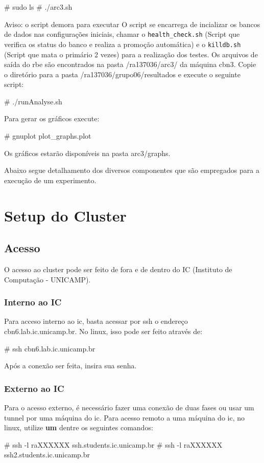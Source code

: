 \documentclass[a4paper,10pt]{article}
\begin{document}
    \begin{spverbatim}
# sudo ls
# ./arc3.sh
    \end{spverbatim}

  	Aviso: o script demora para executar
    O script se encarrega de incializar os bancos de dados nas configurações iniciais, chamar o \verb|health_check.sh| (Script que verifica os status do banco e realiza a promoção automática) e o \verb|killdb.sh| (Script que mata o primário 2 vezes) para a realização dos testes. Os arquivos de saída do rbe são encontrados na pasta /ra137036/arc3/ da máquina cbn3. Copie o diretório para a pasta /ra137036/grupo06/resultados e execute o seguinte script:
    
    \begin{spverbatim}
# ./runAnalyse.sh
    \end{spverbatim}

    Para gerar os gráficos execute:
    \begin{spverbatim}
# gnuplot plot_graphs.plot
    \end{spverbatim}

     Os gráficos estarão disponíveis na pasta arc3/graphs.
     
	Abaixo segue detalhamento dos diversos componentes que são empregados para a execução de um experimento.

\section{Setup do Cluster}
    \subsection{Acesso}
    O acesso ao cluster pode ser feito de fora e de dentro do IC (Instituto de Computação - UNICAMP).
        \subsubsection{Interno ao IC}
        Para acceso interno ao ic, basta acessar por ssh o endereço cbn6.lab.ic.unicamp.br. No linux, isso pode ser feito através de:
        \begin{spverbatim}
        # ssh cbn6.lab.ic.unicamp.br
        \end{spverbatim}

        Após a conexão ser feita, insira sua senha.
        \subsubsection{Externo ao IC}
        Para o acesso externo, é necessário fazer uma conexão de duas fases ou usar um tunnel por uma máquina do ic. Para acesso remoto a uma máquina do ic, no linux, utilize \textbf{um} dentre os seguintes comandos:
        \begin{spverbatim}
        # ssh -l raXXXXXX ssh.students.ic.unicamp.br
        # ssh -l raXXXXXX ssh2.students.ic.unicamp.br
        \end{spverbatim}
\end{document}
